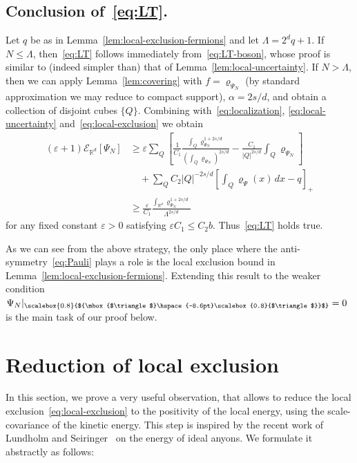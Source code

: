 \documentclass[10pt]{amsart}
\theoremstyle{definition}\newtheorem{defi}[theo]{Definition}\newtheorem{rema}[theo]{Remark}\newtheorem{exam}[theo]{Example}\newtheorem{exem}[theo]{Example}\newtheorem{nota}[theo]{Notation}
\newcommand*\eps{\varepsilon}
\newcommand*\R {\mathbb{R}}
\newcommand\1{{\ensuremath {\mathds 1} }}
\newcommand{\cE}{\mathcal{E}}
\newcommand{\bDelta}{{\mbox{$\triangle$}\hspace{-8.6pt}\scalebox{0.8}{$\triangle$}}}
\newcommand{\scriptbDelta}{\scalebox{0.8}{$\bDelta$}}
\begin{document}
\subsection*{Conclusion of~\eqref{eq:LT}.}
Let $q$ be as in Lemma~\ref{lem:local-exclusion-fermions} and let $\Lambda=2^d q+1$. If $N\le \Lambda$, then~\eqref{eq:LT} follows immediately from~\eqref{eq:LT-boson}, whose proof is similar to (indeed simpler than) that of Lemma~\ref{lem:local-uncertainty}. If $N> \Lambda$, then we can apply Lemma~\ref{lem:covering} with $f=\varrho_{\Psi_N}$ (by standard approximation we may reduce to compact support), $\alpha=2s/d$, and obtain a collection of disjoint cubes $\{Q\}$. Combining with~\eqref{eq:localization}, \eqref{eq:local-uncertainty} and~\eqref{eq:local-exclusion} we obtain
\begin{align*}
(\eps+1) \cE_{\R^d}[\Psi_N] &\ge \eps \sum_Q \left[\frac{1}{C_1}\frac{\int_Q \varrho_{\Psi_N}^{1+2s/d}}{\left(\int_Q \varrho_{\Psi_N} \right)^{2s/d}} - \frac{C_1}{|Q|^{2s/d}} \int_Q \varrho_{\Psi_N}\right] \\
& \quad + \sum_Q C_2 |Q|^{-2s/d} \left[\int_Q \varrho_\Psi(x)\,dx - q \right]_+ \\
&\ge \frac{\eps}{C_1} \frac{\int_{\R^d} \varrho_{\Psi_N}^{1+2s/d}}{\Lambda^{2s/d}}
\end{align*}
for any fixed constant $\eps>0$ satisfying $\eps C_1\le C_2 b$. Thus~\eqref{eq:LT} holds true.


As we can see from the above strategy, the only place where the anti-symmetry~\eqref{eq:Pauli} plays a role is the local exclusion bound in Lemma~\ref{lem:local-exclusion-fermions}. Extending this result to the weaker condition $\Psi_N\rvert_{\scriptbDelta}=0$ is the main task of our proof below.



\section{Reduction of local exclusion} \label{sec:reduction}
In this section, we prove a very useful observation, that allows to reduce the local exclusion~\eqref{eq:local-exclusion} to the positivity of the local energy, using the scale-covariance of the kinetic energy. This step is inspired by the recent work of Lundholm and Seiringer~\cite{LunSei-18} on the energy of ideal anyons. We formulate it abstractly as follows:
\end{document}
